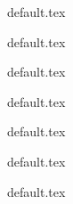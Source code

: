 



{default.tex}

{default.tex}

{default.tex}

{default.tex}

{default.tex}

{default.tex}

{default.tex}


